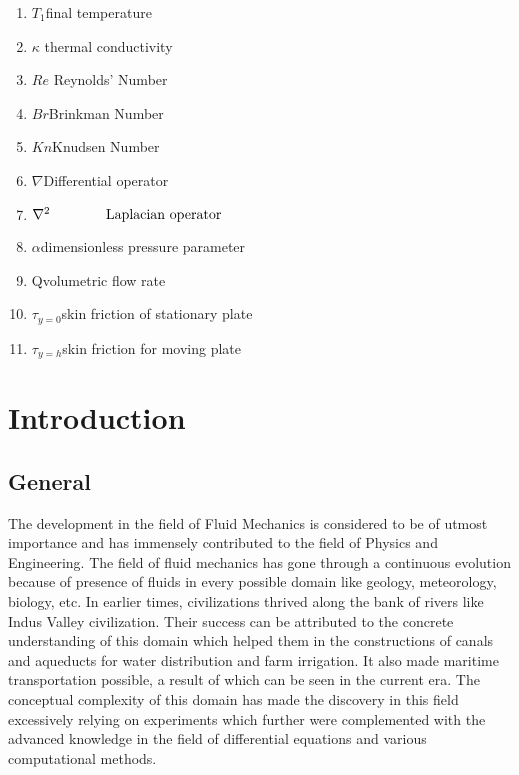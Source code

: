 \documentclass[14pt,one side, a4paper]{extbook}
\begin{document}
\begin{enumerate}
			\item {$T_1$\hspace*{1.2cm}final temperature}
			\item {$\kappa$\hspace*{1.3cm} thermal conductivity}
			\item {$Re$\hspace*{1cm} Reynolds' Number}
			\item {$Br$\hspace*{1.2cm}Brinkman Number}
			\item {$Kn$\hspace*{1.1cm}Knudsen Number}
			\item {$\nabla$\hspace*{1.5cm}Differential operator}
			\item {$\nabla^{2}\hspace*{1.4cm}\textrm{Laplacian operator}$}
			\item{$\alpha$\hspace*{1.6cm}dimensionless pressure parameter}
			\item {Q\hspace*{1.6cm}volumetric flow rate}
			\item {$\tau_{y=0}$\hspace*{1.2cm}skin friction of stationary plate}
			\item {$\tau_{y=h}$\hspace*{1.2cm}skin friction for moving plate}
		\end{enumerate}
		\cleardoublepage
		\listoffigures
		\tableofcontents

	\chapter{Introduction}
	\section{General} The development in the field of Fluid Mechanics is considered to be of utmost importance and has immensely contributed to the field of Physics and Engineering. The field of fluid mechanics has gone through a continuous evolution because of presence of fluids in every possible domain like geology, meteorology, biology, etc.
	In earlier times, civilizations thrived along the bank of rivers like Indus Valley civilization. Their success can be attributed to the concrete understanding of this domain which helped them in the constructions of canals and aqueducts for water distribution and farm irrigation. It also made maritime transportation possible, a result of which can be seen in the current era.
	The conceptual complexity of this domain has made the discovery in this field excessively relying on experiments which further were complemented with the advanced knowledge in the field of differential equations and various computational methods.
\end{document}
